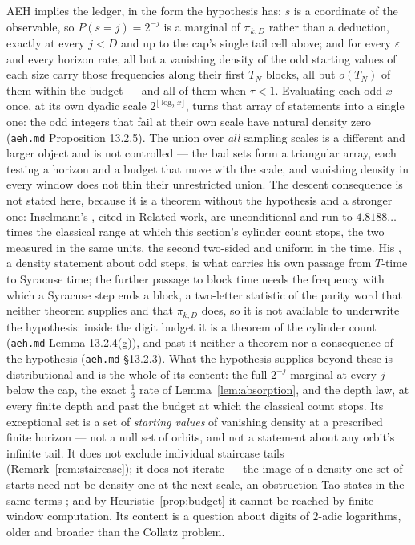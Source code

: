 \documentclass[11pt]{article}
\theoremstyle{remark}
\begin{document}
AEH implies the ledger, in the form the hypothesis has: $s$ is a coordinate of
the observable, so $P(s = j) = 2^{-j}$ is a marginal of $\pi_{k,D}$ rather than a
deduction, exactly at every $j < D$ and up to the cap's single tail cell above;
and for every $\varepsilon$ and every horizon rate, all but a vanishing density of
the odd starting values of each size carry those frequencies along their first
$T_N$ blocks, all but $o(T_N)$ of them within the budget --- and all of them when
$\tau < 1$. Evaluating
each odd $x$ once, at its own dyadic scale $2^{\lfloor \log_2 x\rfloor}$, turns
that array of statements into a single one: the odd integers that fail at their
own scale have natural density zero (\texttt{aeh.md} Proposition 13.2.5). The
union over \emph{all} sampling scales is a different and larger object and is not
controlled --- the bad sets form a triangular array, each testing a horizon and a
budget that move with the scale, and vanishing density in every window does not
thin their unrestricted union. The
descent consequence is not stated here, because it is a theorem without the
hypothesis and a stronger one: Inselmann's \cite[Cor.~1.4, Thm.~1.10]{inselmann},
cited in Related work, are unconditional and run to $4.8188\ldots$ times the
classical range at which this section's cylinder count stops, the two measured in
the same units, the second two-sided and uniform in the time. His
\cite[Thm.~1.6]{inselmann}, a density statement about odd steps, is what
carries his own passage from $T$-time to Syracuse time; the further passage to
block time needs the frequency with which a Syracuse step ends a block, a
two-letter statistic of the parity word that neither theorem supplies and that
$\pi_{k,D}$ does, so it is not available to underwrite the hypothesis: inside the
digit budget it is a theorem of the cylinder count (\texttt{aeh.md}
Lemma 13.2.4(g)), and past it neither a theorem nor a consequence of the hypothesis
(\texttt{aeh.md} \S13.2.3). What the hypothesis supplies beyond these is
distributional and is the whole of its content: the full $2^{-j}$ marginal at every
$j$ below the cap, the exact $\tfrac13$ rate of Lemma~\ref{lem:absorption}, and the
depth law, at every finite depth and past the budget at which the classical count
stops. Its exceptional set is a set of \emph{starting values} of vanishing density
at a prescribed finite horizon --- not a null set of orbits, and not a statement
about any orbit's infinite tail. It does not exclude individual staircase tails
(Remark~\ref{rem:staircase}); it does not iterate --- the image of a density-one set
of starts need not be density-one at the next scale, an obstruction Tao states in the
same terms \cite{tao}; and by Heuristic~\ref{prop:budget} it cannot be reached by
finite-window computation. Its content is a question about digits of $2$-adic
logarithms, older and broader than the Collatz problem.
\end{document}
